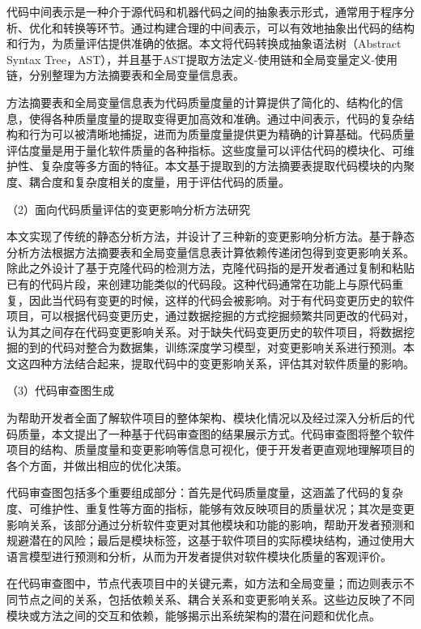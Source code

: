 代码中间表示是一种介于源代码和机器代码之间的抽象表示形式，通常用于程序分析、优化和转换等环节。通过构建合理的中间表示，可以有效地抽象出代码的结构和行为，为质量评估提供准确的依据。本文将代码转换成抽象语法树（Abstract Syntax Tree，AST），并且基于AST提取方法定义-使用链和全局变量定义-使用链，分别整理为方法摘要表和全局变量信息表。

方法摘要表和全局变量信息表为代码质量度量的计算提供了简化的、结构化的信息，使得各种质量度量的提取变得更加高效和准确。通过中间表示，代码的复杂结构和行为可以被清晰地捕捉，进而为质量度量提供更为精确的计算基础。代码质量评估度量是用于量化软件质量的各种指标。这些度量可以评估代码的模块化、可维护性、复杂度等多方面的特征。本文基于提取到的方法摘要表提取代码模块的内聚度、耦合度和复杂度相关的度量，用于评估代码的质量。

（2）面向代码质量评估的变更影响分析方法研究

本文实现了传统的静态分析方法，并设计了三种新的变更影响分析方法。基于静态分析方法根据方法摘要表和全局变量信息表计算依赖传递闭包得到变更影响关系。除此之外设计了基于克隆代码的检测方法，克隆代码指的是开发者通过复制和粘贴已有的代码片段，来创建功能类似的代码段。这种代码通常在功能上与原代码重复，因此当代码有变更的时候，这样的代码会被影响。对于有代码变更历史的软件项目，可以根据代码变更历史，通过数据挖掘的方式挖掘频繁共同更改的代码对，认为其之间存在代码变更影响关系。对于缺失代码变更历史的软件项目，将数据挖掘的到的代码对整合为数据集，训练深度学习模型，对变更影响关系进行预测。本文这四种方法结合起来，提取代码中的变更影响关系，评估其对软件质量的影响。



（3）代码审查图生成

为帮助开发者全面了解软件项目的整体架构、模块化情况以及经过深入分析后的代码质量，本文提出了一种基于代码审查图的结果展示方式。代码审查图将整个软件项目的结构、质量度量和变更影响等信息可视化，便于开发者更直观地理解项目的各个方面，并做出相应的优化决策。

代码审查图包括多个重要组成部分：首先是代码质量度量，这涵盖了代码的复杂度、可维护性、重复性等方面的指标，能够有效反映项目的质量状况；其次是变更影响关系，该部分通过分析软件变更对其他模块和功能的影响，帮助开发者预测和规避潜在的风险；最后是模块标签，这基于软件项目的实际模块结构，通过使用大语言模型进行预测和分析，从而为开发者提供对软件模块化质量的客观评价。

在代码审查图中，节点代表项目中的关键元素，如方法和全局变量；而边则表示不同节点之间的关系，包括依赖关系、耦合关系和变更影响关系。这些边反映了不同模块或方法之间的交互和依赖，能够揭示出系统架构的潜在问题和优化点。

